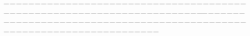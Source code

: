 \documentclass[a4paper, 11pt, UTF8]{article}
\def\ProblemEnding{{\tiny \_\,\_\,\_\,\_\,\_\,\_\,\_\,\_\,\_\,\_\,\_\,\_\,\_\,\_\,\_\,\_\,\_\,\_\,\_\,\_\,\_\,\_\,\_\,\_\,\_\,\_\,\_\,\_\,\_\,\_\,\_\,\_\,\_\,\_\,\_\,\_\,\_\,\_\,\_\,\_\,\_\,\_\,\_\,\_\,\_\,\_\,\_\,\_\,\_\,\_\,\_\,\_\,\_\,\_\,\_\,\_\,\_\,\_\,\_\,\_\,\_\,\_\,\_\,\_\,\_\,\_\,\_\,\_\,\_\,\_\,\_\_\,\_\,\_\,\_\,\_\,\_\,\_\,\_\,\_\,\_\,\_\,\_\,\_\,\_\,\_\,\_\,\_\,\_\,\_\,\_\,\_\,\_\,\_\,\_\,\_\,\_\,\_\,\_\,\_\,\_\,\_\,\_\,\_\,\_\,\_\,\_\,\_\,\_\,\_\,\_\,\_\,\_\,\_\,\_\,\_\,\_\,\_\,\_\,\_\,\_\,\_\,\_\,\_\,\_\,\_\,\_\,\_\,\_\,\_\,\_\,\_\,\_\,\_\,\_\,\_\,\_\,\_\,\_\,\_\,\_\,\_}}
\begin{document}
\begin{large}
\ProblemEnding\par


\end{large}
\end{document}
